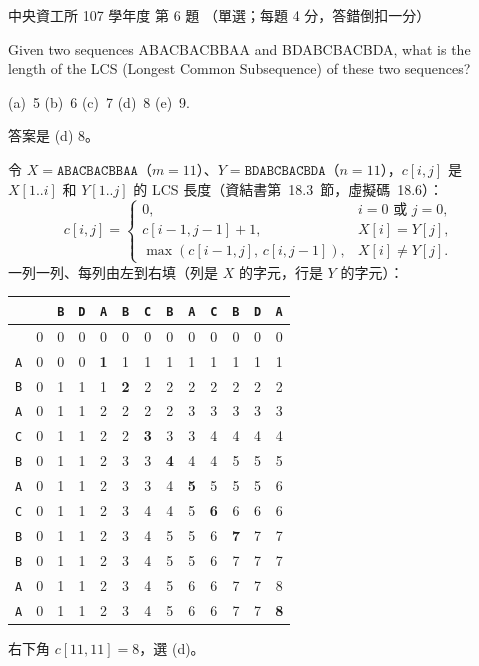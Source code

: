 \begin{pastexam}[label={px:ncu-107-dsa-06}]{中央資工所 107 學年度 第 6 題}
（單選；每題 4 分，答錯倒扣一分）

Given two sequences ABACBACBBAA and BDABCBACBDA, what is the length of the LCS (Longest Common
Subsequence) of these two sequences?

(a)~5 \qquad (b)~6 \qquad (c)~7 \qquad (d)~8 \qquad (e)~9.
\end{pastexam}

\begin{pastsoln}
答案是 (d) 8。

令 $X = \mathtt{ABACBACBBAA}$（$m = 11$）、$Y = \mathtt{BDABCBACBDA}$（$n = 11$），$c[i, j]$ 是
$X[1..i]$ 和 $Y[1..j]$ 的 LCS 長度（資結書第~18.3~節，虛擬碼~18.6）：
\[
c[i, j] =
\begin{cases}
0, & i = 0 \text{ 或 } j = 0,\\
c[i-1, j-1] + 1, & X[i] = Y[j],\\
\max(c[i-1, j],\, c[i, j-1]), & X[i] \ne Y[j].
\end{cases}
\]
一列一列、每列由左到右填（列是 $X$ 的字元，行是 $Y$ 的字元）：
\begin{center}
\small
\setlength{\tabcolsep}{4.2pt}
\begin{tabular}{c|cccccccccccc}
 & & \texttt{B} & \texttt{D} & \texttt{A} & \texttt{B} & \texttt{C} & \texttt{B} & \texttt{A} & \texttt{C} & \texttt{B} & \texttt{D} & \texttt{A} \\ \hline
 & 0 & 0 & 0 & 0 & 0 & 0 & 0 & 0 & 0 & 0 & 0 & 0 \\
\texttt{A} & 0 & 0 & 0 & \textbf{1} & 1 & 1 & 1 & 1 & 1 & 1 & 1 & 1 \\
\texttt{B} & 0 & 1 & 1 & 1 & \textbf{2} & 2 & 2 & 2 & 2 & 2 & 2 & 2 \\
\texttt{A} & 0 & 1 & 1 & 2 & 2 & 2 & 2 & 3 & 3 & 3 & 3 & 3 \\
\texttt{C} & 0 & 1 & 1 & 2 & 2 & \textbf{3} & 3 & 3 & 4 & 4 & 4 & 4 \\
\texttt{B} & 0 & 1 & 1 & 2 & 3 & 3 & \textbf{4} & 4 & 4 & 5 & 5 & 5 \\
\texttt{A} & 0 & 1 & 1 & 2 & 3 & 3 & 4 & \textbf{5} & 5 & 5 & 5 & 6 \\
\texttt{C} & 0 & 1 & 1 & 2 & 3 & 4 & 4 & 5 & \textbf{6} & 6 & 6 & 6 \\
\texttt{B} & 0 & 1 & 1 & 2 & 3 & 4 & 5 & 5 & 6 & \textbf{7} & 7 & 7 \\
\texttt{B} & 0 & 1 & 1 & 2 & 3 & 4 & 5 & 5 & 6 & 7 & 7 & 7 \\
\texttt{A} & 0 & 1 & 1 & 2 & 3 & 4 & 5 & 6 & 6 & 7 & 7 & 8 \\
\texttt{A} & 0 & 1 & 1 & 2 & 3 & 4 & 5 & 6 & 6 & 7 & 7 & \textbf{8} \\
\end{tabular}
\end{center}
右下角 $c[11, 11] = 8$，選 (d)。


\end{pastsoln}
